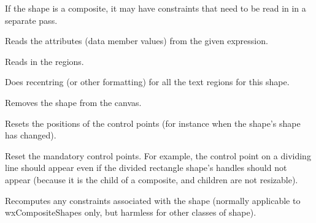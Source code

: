 

If the shape is a composite, it may have constraints that need to be read in in a separate pass.



Reads the attributes (data member values) from the given expression.



Reads in the regions.



Does recentring (or other formatting) for all the text regions for this shape.



Removes the shape from the canvas.



Resets the positions of the control points (for instance when the
shape's shape has changed).



Reset the mandatory control points. For example, the control point on a dividing line should
appear even if the divided rectangle shape's handles should not appear (because it is the child of
a composite, and children are not resizable).

\label{wxshaperecompute}


Recomputes any constraints associated with the shape (normally
applicable to wxCompositeShapes only, but harmless for other
classes of shape).



